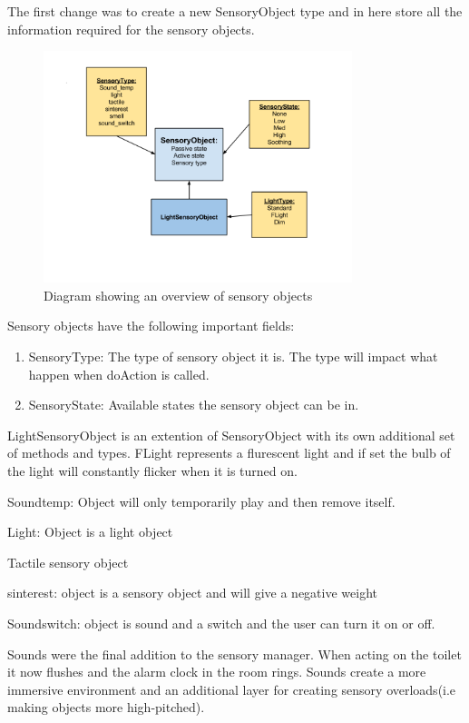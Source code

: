 \documentclass[11pt]{report}
\begin{document}
The first change was to create a new SensoryObject type and in here store all the information required for the sensory objects. 

\begin{figure}[H]
\centering
\includegraphics[width=90mm]{images/implementationfirst/sensoryobject.png}
\caption{Diagram showing an overview of sensory objects}
\label{sensorysystem}
\end{figure}

Sensory objects have the following important fields:
\begin{enumerate}
\item SensoryType: The type of sensory object it is. The type will impact what happen when doAction is called.
\item SensoryState: Available states the sensory object can be in. 
\end{enumerate}

LightSensoryObject is an extention of SensoryObject with its own additional set of methods and types. FLight represents a flurescent light and if set the bulb of the light will constantly flicker when it is turned on.

\begin{description}
\item Soundtemp: Object will only temporarily play and then remove itself.
\item Light: Object is a light object
\item Tactile sensory object
\item sinterest: object is a sensory object and will give a negative weight
\item Soundswitch: object is sound and a switch and the user can turn it on or off.
\end{description}

Sounds were the final addition to the sensory manager. When acting on the toilet it now flushes and the alarm clock in the room rings. Sounds create a more immersive environment and an additional layer for creating sensory overloads(i.e making objects more high-pitched). 
\end{document}
